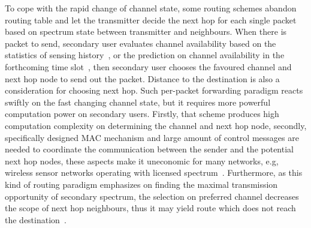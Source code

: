 To cope with the rapid change of channel state, some routing schemes abandon routing table and let the transmitter decide the next hop for each single packet based on spectrum state between transmitter and neighbours.
When there is packet to send, secondary user evaluates channel availability based on the statistics of sensing history~\cite{routing-crn-icc11}, or the prediction on channel availability in the forthcoming time slot~\cite{routing-crn-jsac12}, then secondary user chooses the favoured channel and next hop node to send out the packet.
Distance to the destination is also a consideration for choosing next hop.
Such per-packet forwarding paradigm reacts swiftly on the fast changing channel state, but it requires more powerful computation power on secondary users.
Firstly, that scheme produces high computation complexity on determining the channel and next hop node, secondly, specifically designed MAC mechanism and large amount of control messages are needed to coordinate the communication between the sender and the potential next hop nodes, these aspects make it uneconomic for many networks, e.g, wireless sensor networks operating with licensed spectrum~\cite{delay-cogwsn-2014}.
Furthermore, as this kind of routing paradigm emphasizes on finding the maximal transmission opportunity of secondary spectrum, the selection on preferred channel decreases the scope of next hop neighbours, thus it may yield route which does not reach the destination~\cite{commag-Khalife08, spectrumDecision_2013mass}.



